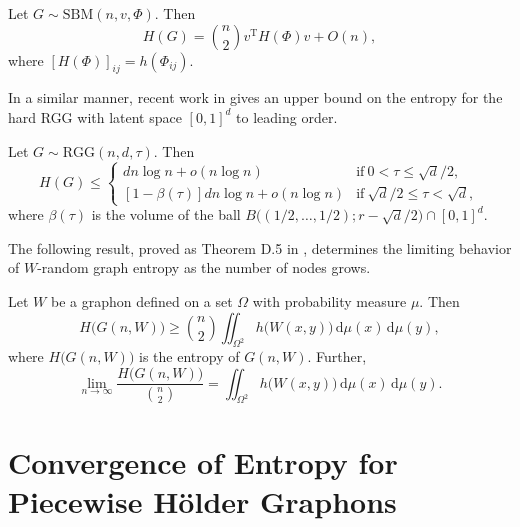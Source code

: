 \documentclass{svproc}
\newcommand{\1}{\mathbbm{1}}
\newcommand{\T}{\mathrm{T}}
\newcommand{\dd}{\,\mathrm{d}}
\begin{document}
\begin{proposition}\label{abbe}
Let $G\sim\mathrm{SBM}(n,v,\Phi)$. Then
\[H(G) = \binom{n}{2}v^\T H(\Phi) v+O(n),\]
where $[H(\Phi)]_{ij} = h(\Phi_{ij})$.
\end{proposition}

In a similar manner, recent work in \cite{vippathalla2026} gives an upper bound on the entropy for the hard RGG with latent space $[0,1]^d$ to leading order. 

\begin{proposition}\label{rgg}
Let $G\sim\mathrm{RGG}(n,d,\tau)$. Then
\[H(G)\leq\begin{cases}dn\log n+o(n\log n) & \text{if}~0<\tau\leq\sqrt{d}/2,\\ [1-\beta(\tau)]dn\log n+o(n\log n) & \text{if}~\sqrt{d}/2\leq \tau<\sqrt{d},\end{cases}\]
where $\beta(\tau)$ is the volume of the ball $B\big((1/2,\dots,1/2); r-\sqrt{d}/2\big)\cap[0,1]^d$.
\end{proposition}



The following result, proved as Theorem D.5 in \cite{janson2013}, determines the limiting behavior of $W$-random graph entropy as the number of nodes grows. 

\begin{proposition}\label{jan_prop}
Let $W$ be a graphon defined on a set $\Omega$ with probability measure $\mu$. Then 
\begin{equation}\label{lowbnd}
H\big(G(n,W)\big)\geq\binom{n}{2} \iint_{\Omega^2}h\big(W(x,y)\big)\dd\mu(x)\dd\mu(y),
\end{equation}
where $H\big(G(n,W)\big)$ is the entropy of $G(n,W)$. Further,
\begin{equation}
\lim_{n\to\infty}\frac{H\big(G(n,W)\big)}{\binom n2} = \iint_{\Omega^2}h\big(W(x,y)\big)\dd\mu(x)\dd\mu(y).
\end{equation}
\end{proposition}

\section{Convergence of Entropy for Piecewise H\"{o}lder Graphons}\label{sec3}
\end{document}
